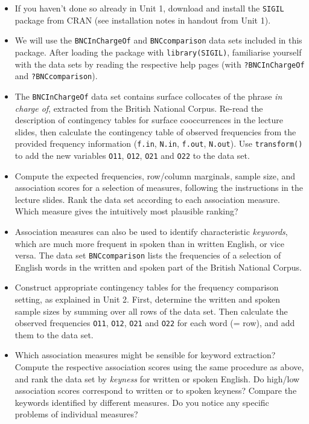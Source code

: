 \documentclass[a4paper,12pt]{article}
\begin{document}
\begin{itemize}
\item If you haven't done so already in Unit 1, download and install the
  \texttt{SIGIL} package from CRAN (see installation notes in handout from
  Unit 1).
\item We will use the \texttt{BNCInChargeOf} and \texttt{BNCcomparison} data
  sets included in this package. After loading the package with
  \texttt{library(SIGIL)}, familiarise yourself with the data sets by
  reading the respective help pages (with \texttt{?BNCInChargeOf} and
  \texttt{?BNCcomparison}).
\item The \texttt{BNCInChargeOf} data set contains surface collocates of
  the phrase \emph{in charge of}, extracted from the British National Corpus.
  Re-read the description of contingency tables
  for surface cooccurrences in the lecture slides, then calculate the
  contingency table of observed frequencies from the provided frequency
  information (\texttt{f.in}, \texttt{N.in}, \texttt{f.out}, \texttt{N.out}).
  Use \texttt{transform()} to add the new variables \texttt{O11},
  \texttt{O12}, \texttt{O21} and \texttt{O22} to the data set.
\item Compute the expected frequencies, row/column marginals, sample size, and
  association scores for a selection of measures, following the instructions
  in the lecture slides.  Rank the data set according to each association
  measure.  Which measure gives the intuitively most plausible ranking?
\item Association measures can also be used to identify characteristic
  \emph{keywords}, which are much more frequent in spoken than in written
  English, or vice versa.  The data set \texttt{BNCcomparison} lists the
  frequencies of a selection of English words in the written and spoken part
  of the British National Corpus.
\item Construct appropriate contingency tables for the frequency comparison
  setting, as explained in Unit 2.  First, determine the written and spoken
  sample sizes by summing over all rows of the data set.  Then calculate the
  observed frequencies \texttt{O11}, \texttt{O12}, \texttt{O21} and
  \texttt{O22} for each word (= row), and add them to the data set.
\item Which association measures might be sensible for keyword extraction?
  Compute the respective association scores using the same procedure as above,
  and rank the data set by \emph{keyness} for written or spoken English.  Do
  high/low association scores correspond to written or to spoken keyness?
  Compare the keywords identified by different measures.  Do you notice any
  specific problems of individual measures?
\end{itemize}
\end{document}
